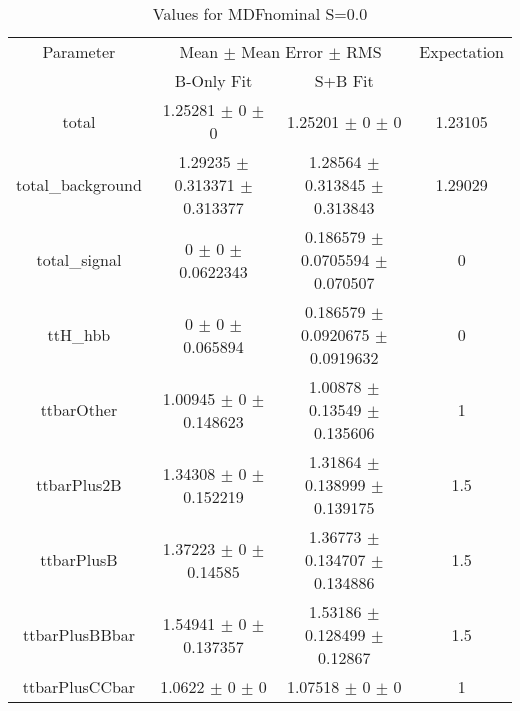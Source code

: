 \begin{table}
\centering
\caption{Values for MDFnominal S=0.0}
\begin{tabular}{cccc}
\toprule
Parameter & \multicolumn{2}{c}{Mean $\pm$ Mean Error $\pm$ RMS} & Expectation\\
 & B-Only Fit & S+B Fit & \\
\midrule
total & \num{1.25281} $\pm$ \num{0} $\pm$ \num{0} & \num{1.25201} $\pm$ \num{0} $\pm$ \num{0} & \num{1.23105}\\
total\_background & \num{1.29235} $\pm$ \num{0.313371} $\pm$ \num{0.313377} & \num{1.28564} $\pm$ \num{0.313845} $\pm$ \num{0.313843} & \num{1.29029}\\
total\_signal & \num{0} $\pm$ \num{0} $\pm$ \num{0.0622343} & \num{0.186579} $\pm$ \num{0.0705594} $\pm$ \num{0.070507} & \num{0}\\
ttH\_hbb & \num{0} $\pm$ \num{0} $\pm$ \num{0.065894} & \num{0.186579} $\pm$ \num{0.0920675} $\pm$ \num{0.0919632} & \num{0}\\
ttbarOther & \num{1.00945} $\pm$ \num{0} $\pm$ \num{0.148623} & \num{1.00878} $\pm$ \num{0.13549} $\pm$ \num{0.135606} & \num{1}\\
ttbarPlus2B & \num{1.34308} $\pm$ \num{0} $\pm$ \num{0.152219} & \num{1.31864} $\pm$ \num{0.138999} $\pm$ \num{0.139175} & \num{1.5}\\
ttbarPlusB & \num{1.37223} $\pm$ \num{0} $\pm$ \num{0.14585} & \num{1.36773} $\pm$ \num{0.134707} $\pm$ \num{0.134886} & \num{1.5}\\
ttbarPlusBBbar & \num{1.54941} $\pm$ \num{0} $\pm$ \num{0.137357} & \num{1.53186} $\pm$ \num{0.128499} $\pm$ \num{0.12867} & \num{1.5}\\
ttbarPlusCCbar & \num{1.0622} $\pm$ \num{0} $\pm$ \num{0} & \num{1.07518} $\pm$ \num{0} $\pm$ \num{0} & \num{1}\\
\bottomrule
\end{tabular}
\end{table}